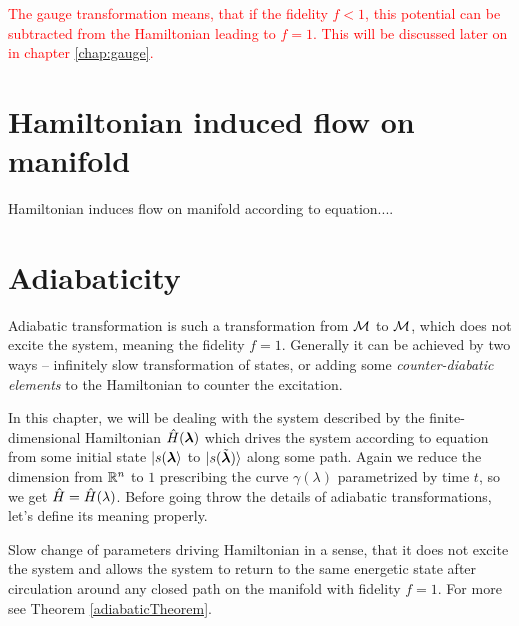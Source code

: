 \textcolor{red}{The gauge transformation means, that if the fidelity $f<1$, this potential can be subtracted from the Hamiltonian leading to $f=1$. This will be discussed later on in chapter \ref{chap:gauge}.}


\section{Hamiltonian induced flow on manifold}
Hamiltonian induces flow on manifold according to \Schrodinger equation....



\newpage





\section{Adiabaticity}
Adiabatic transformation is such a transformation from $\mathcal{M}$ to $\mathcal{M}$, which does not excite the system, meaning the fidelity $f=1$. Generally it can be achieved by two ways -- infinitely slow transformation of states, or adding some \emph{counter-diabatic elements} to the Hamiltonian to counter the excitation.


In this chapter, we will be dealing with the system described by the finite-dimensional Hamiltonian $\hat{H}({\bm\lambda})$ which drives the system according to \Schrodinger equation from some initial state $\ket{s({\bm\lambda}}$ to $\ket{s(\tilde{{\bm\lambda}})}$ along some path. Again we reduce the dimension from $\mathbb{R}^n$ to $1$ prescribing the curve $\gamma(\lambda)$ parametrized by time $t$, so we get $\hat{H}=\hat{H}(\lambda)$. Before going throw the details of adiabatic transformations, let's define its meaning properly.

\begin{definition}[Adibaticity]
    Slow change of parameters driving Hamiltonian in a sense, that it does not excite the system and allows the system to return to the same energetic state after circulation around any closed path on the manifold with fidelity $f=1$. For more see Theorem \ref{adiabaticTheorem}.
\end{definition}


